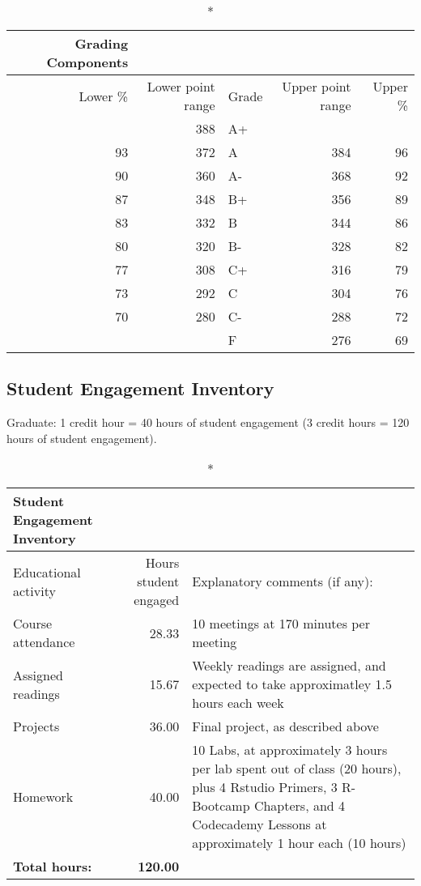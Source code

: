 \documentclass[
  letterpaper,
  DIV=11,
  numbers=noendperiod]{scrartcl}
\begin{document}
\begin{longtable*}{rrlrr}
\caption*{
{\large \textbf{Grading Components}}
} \\ 
\toprule
Lower \% & Lower point range & Grade & Upper point range & Upper \% \\ 
\midrule{} & 388 & A+ &  &  \\ 
93 & 372 & A & 384 & 96 \\ 
90 & 360 & A- & 368 & 92 \\ 
87 & 348 & B+ & 356 & 89 \\ 
83 & 332 & B & 344 & 86 \\ 
80 & 320 & B- & 328 & 82 \\ 
77 & 308 & C+ & 316 & 79 \\ 
73 & 292 & C & 304 & 76 \\ 
70 & 280 & C- & 288 & 72 \\ 
 &  & F & 276 & 69 \\ 
\bottomrule
\end{longtable*}

\hypertarget{student-engagement-inventory}{%
\subsection{Student Engagement
Inventory}\label{student-engagement-inventory}}

Graduate: 1 credit hour = 40 hours of student engagement (3 credit hours
= 120 hours of student engagement).

\begin{longtable*}{lrl}
\caption*{
{\large \textbf{Student Engagement Inventory}}
} \\ 
\toprule
Educational activity & Hours student engaged & Explanatory comments (if any): \\ 
\midrule\addlinespace[2.5pt]
Course attendance & 28.33 & 10 meetings at 170 minutes per meeting \\ 
Assigned readings & 15.67 & Weekly readings are assigned, and expected to take approximatley 1.5 hours each week \\ 
Projects & 36.00 & Final project, as described above \\ 
Homework & 40.00 & 10 Labs, at approximately 3 hours per lab spent out of class (20 hours), plus 4 Rstudio Primers, 3 R-Bootcamp Chapters, and 4 Codecademy Lessons at approximately 1 hour each (10 hours) \\ 
\textbf{Total hours:} & \textbf{120.00} & \textbf{} \\ 
\bottomrule
\end{longtable*}
\end{document}
